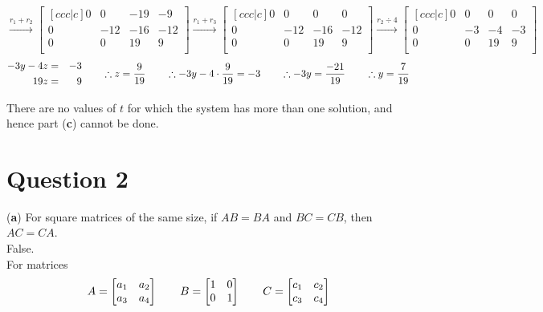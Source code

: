 \documentclass[12pt]{article}
\begin{document}
$$
\overset{r_1+r_2}{\longrightarrow}
\begin{bmatrix}[ccc|c]
  0 & 0 & -19 & -9 \\
   0 & -12 & -16 & -12 \\
   0 & 0 & 19 & 9 \\
\end{bmatrix} \overset{r_1+r_3}{\longrightarrow}
\begin{bmatrix}[ccc|c]
  0 & 0 & 0 & 0 \\
   0 & -12 & -16 & -12 \\
   0 & 0 & 19 & 9 \\
\end{bmatrix} \overset{r_2\div4}{\longrightarrow}
\begin{bmatrix}[ccc|c]
  0 & 0 & 0 & 0 \\
   0 & -3 & -4 & -3 \\
   0 & 0 & 19 & 9 \\
\end{bmatrix}
$$
$$
\begin{aligned}
-3y-4z&=&-3 \\
19z&=&9
\end{aligned}
\hspace*{20px}
\therefore z=\frac{9}{19}
\hspace*{20px}
\therefore -3y-4\cdot\frac{9}{19}= -3
\hspace*{20px}
\therefore -3y=\frac{-21}{19} 
\hspace*{20px}
\therefore y=\frac{7}{19}
$$

There are no values of $t$ for which the system has more than one solution, and hence part (\textbf{c}) cannot be done.

\section*{Question 2}
(\textbf{a}) For square matrices of the same size, if $AB=BA$ and $BC=CB$, then $AC=CA$. \\
False. \\
For matrices 
$$
A = 
\begin{bmatrix}
   a_1 & a_2 \\
   a_3 & a_4 \\
\end{bmatrix}
\hspace*{20px}
B = 
\begin{bmatrix}
   1 & 0 \\
   0 & 1 \\
\end{bmatrix}
\hspace*{20px}
C = 
\begin{bmatrix}
   c_1 & c_2 \\
   c_3 & c_4 \\
\end{bmatrix}
$$
\end{document}

